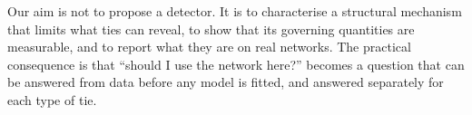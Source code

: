 \documentclass[../elsevier.tex]{subfiles}
\begin{document}
Our aim is not to propose a detector. It is to characterise a structural mechanism
that limits what ties can reveal, to show that its governing quantities are
measurable, and to report what they are on real networks. The practical consequence is
that ``should I use the network here?'' becomes a question that can be answered from
data before any model is fitted, and answered separately for each type of tie.
\end{document}
